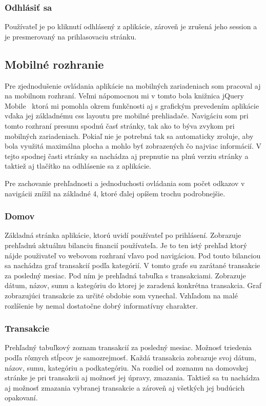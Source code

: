 \documentclass[12pt,onesided]{book}
\begin{document}
\subsubsection{Odhlásiť sa}

Používateľ je po kliknutí odhlásený z aplikácie, zároveň je zrušená jeho session a je presmerovaný na prihlasovaciu stránku.

\subsection{Mobilné rozhranie}
Pre zjednodušenie ovládania aplikácie na mobilných zariadeniach som pracoval aj na mobilnom rozhraní. Veľmi nápomocnou mi v tomto bola knižnica jQuery Mobile \cite{jQueryMobile}\, ktorá mi pomohla okrem funkčnosti aj s grafickým prevedením aplikácie vďaka jej základnému css layoutu pre mobilné prehliadače. Navigáciu som pri tomto rozhraní presunu spodnú časť stránky, tak ako to býva zvykom pri mobilných zariadeniach. Pokiaľ nie je potrebná tak sa automaticky zroluje, aby bola využitá maximálna plocha a mohlo byť zobrazených čo najviac informácií. V tejto spodnej časti stránky sa nachádza aj prepnutie na plnú verziu stránky a taktiež aj tlačítko na odhlásenie sa z aplikácie. 

Pre zachovanie prehľadnosti a jednoduchosti ovládania som počet odkazov v navigácii znížil na základné 4, ktoré ďalej opíšem trochu podrobnejšie. 

\subsubsection{Domov}
Základná stránka aplikácie, ktorú uvidí používateľ po prihlásení. Zobrazuje prehľadnú aktuálnu bilanciu financií používateľa. Je to ten istý prehľad ktorý nájde použivateľ vo webovom rozhraní  vľavo pod navigáciou. Pod touto bilanciou sa nachádza graf transakcií podľa kategórií. V tomto grafe su zarátané transakcie za posledný mesiac. Pod ním je prehľadná tabuľka s transakciami. Zobrazuje dátum, názov, sumu a kategóriu do ktorej je zaradená konkrétna transakcia. Graf zobrazujúci transakcie za určité obdobie som vynechal. Vzhľadom na malé rozlíšenie by nemal dostatočne dobrý informatívny charakter.
\subsubsection{Transakcie}
Prehľadný tabuľkový zoznam transakcií za posledný mesiac. Možnosť triedenia podľa rôznych stĺpcov je samozrejmosť. Každá transakcia zobrazuje svoj dátum, názov, sumu, kategóriu a podkategóriu. Na rozdiel od zoznamu na domovskej stránke je pri transakcii aj možnosť jej úpravy, zmazania. Taktiež sa tu nachádza aj možnosť zmazania vybranej transakcie a zároveň aj všetkých jej budúcich opakovaní.
\end{document}
